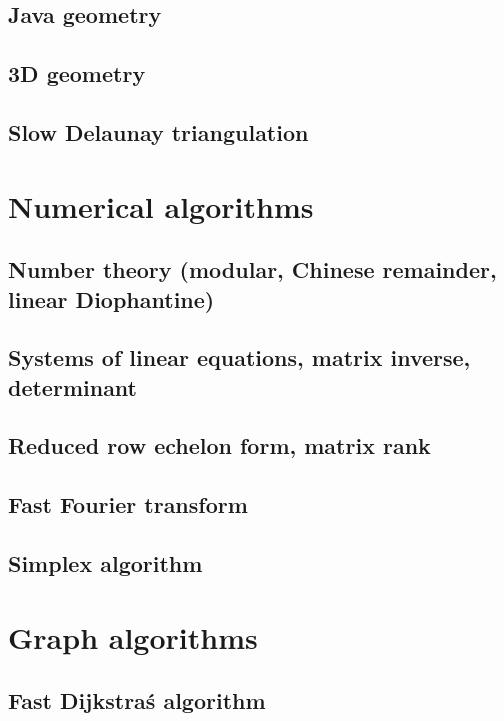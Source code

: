 \documentclass[twocolumn]{article}
\begin{document}
\subsection{Java geometry}

\subsection{3D geometry}

\subsection{Slow Delaunay triangulation}


\section{Numerical algorithms}
\subsection{Number theory (modular, Chinese remainder, linear Diophantine)}

\subsection{Systems of linear equations, matrix inverse, determinant}

\subsection{Reduced row echelon form, matrix rank}

\subsection{Fast Fourier transform}

\subsection{Simplex algorithm}


\section{Graph algorithms}
\subsection{Fast Dijkstra\'s algorithm}

\end{document}

